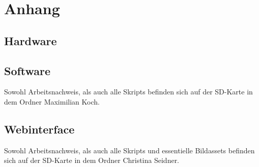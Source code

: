 \chapter{Anhang}


\section{Hardware}



\newpage
\section{Software}

Sowohl Arbeitsnachweis, als auch alle Skripts befinden sich auf der SD-Karte in dem Ordner 
\glqq{}Maximilian Koch\grqq{}.




\newpage
\section{Webinterface}

Sowohl Arbeitsnachweis, als auch alle Skripts und essentielle Bildassets befinden sich auf der SD-Karte in dem Ordner 
\glqq{}Christina Seidner\grqq{}.

